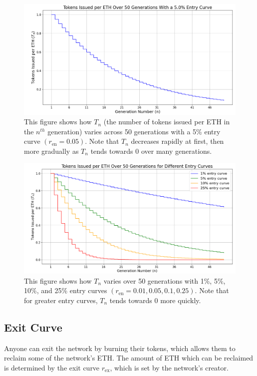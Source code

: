 \documentclass{article}
\begin{document}
\begin{figure}[h]
  \centering
  \includegraphics[width=\textwidth]{figures/single-entry-curve.png}
   \caption{This figure shows how $T_n$ (the number of tokens issued per ETH in the $n^{th}$ generation) varies across 50 generations with a 5\% entry curve $(r_{\text{en}} = 0.05)$. Note that $T_n$ decreases rapidly at first, then more gradually as $T_n$ tends towards 0 over many generations.}
\end{figure}

\clearpage
\begin{figure}[h]
  \centering
  \includegraphics[width=\textwidth]{figures/multi-entry-curves.png}
  \caption{This figure shows how $T_n$ varies over 50 generations with 1\%, 5\%, 10\%, and 25\% entry curves $(r_{\text{en}} = 0.01, 0.05, 0.1, 0.25)$. Note that for greater entry curves, $T_n$ tends towards 0 more quickly.}
\end{figure}

\subsection{Exit Curve}

Anyone can exit the network by burning their tokens, which allows them to reclaim some of the network's ETH. The amount of ETH which can be reclaimed is determined by the exit curve $r_{\text{ex}}$, which is set by the network's creator.
\end{document}
